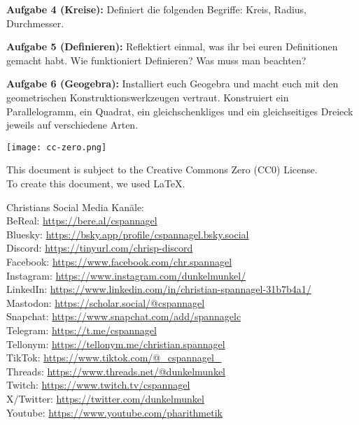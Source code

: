 \documentclass[12pt,a4paper,oneside,ngerman]{article}
\begin{document}
\textbf{Aufgabe 4 (Kreise):} Definiert die folgenden Begriffe: Kreis, Radius, Durchmesser.

\textbf{Aufgabe 5 (Definieren):}  Reflektiert einmal, was ihr bei euren Definitionen gemacht habt. Wie funktioniert Definieren? Was muss man beachten?

\textbf{Aufgabe 6 (Geogebra):} Installiert euch Geogebra und macht euch mit den geometrischen Konstruktionswerkzeugen vertraut. Konstruiert ein Parallelogramm, ein Quadrat, ein gleichschenkliges und ein gleichseitiges Dreieck jeweils auf verschiedene Arten.


\vspace*{10mm}
\texttt{[image: cc-zero.png]}

\tiny{This document is subject to the Creative Commons Zero (CC0) License.
\\ To create this document, we used \LaTeX{}.

Christians Social Media Kanäle:\\
BeReal: \url{https://bere.al/cspannagel}\\
Bluesky: \url{https://bsky.app/profile/cspannagel.bsky.social}\\
Discord: \url{https://tinyurl.com/chrisp-discord}\\
Facebook: \url{https://www.facebook.com/chr.spannagel}\\
Instagram: \url{https://www.instagram.com/dunkelmunkel/}\\
LinkedIn: \url{https://www.linkedin.com/in/christian-spannagel-31b7b4a1/}\\
Mastodon: \url{https://scholar.social/@cspannagel}\\
Snapchat: \url{https://www.snapchat.com/add/spannagelc}\\
Telegram: \url{https://t.me/cspannagel}\\
Tellonym: \url{https://tellonym.me/christian.spannagel}\\
TikTok: \url{https://www.tiktok.com/@_cspannagel_}\\
Threads: \url{https://www.threads.net/@dunkelmunkel}\\
Twitch: \url{https://www.twitch.tv/cspannagel}\\
X/Twitter: \url{https://twitter.com/dunkelmunkel}\\
Youtube: \url{https://www.youtube.com/pharithmetik}}\\


\end{document}
